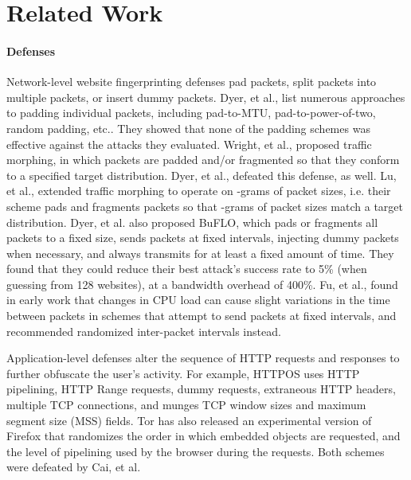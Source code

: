 \documentclass[10pt,journal]{IEEEtran}
\newcommand{\buflo} {BuFLO\xspace}
\begin{document}
\section{Related Work}
\label{sec:related-work}

\paragraph*{Defenses} Network-level website fingerprinting defenses
pad packets, split packets into multiple packets, or insert dummy
packets.  Dyer, et al., list numerous approaches to padding individual
packets, including pad-to-MTU, pad-to-power-of-two, random padding,
etc.\cite{dyer-snp12}.  They showed that none of the padding schemes
was effective against the attacks they evaluated.  Wright, et al.,
proposed traffic morphing, in which packets are padded and/or
fragmented so that they conform to a specified target
distribution\cite{wright-ndss09}.  Dyer, et al., defeated this
defense, as well\cite{dyer-snp12}.  Lu, et al., extended traffic
morphing to operate on -grams of packet sizes, i.e. their scheme
pads and fragments packets so that -grams of packet sizes match a
target distribution\cite{lu-esorics10}.  Dyer, et al. also proposed
\buflo, which pads or fragments all packets to a fixed size, sends
packets at fixed intervals, injecting dummy packets when necessary,
and always transmits for at least a fixed amount of
time\cite{dyer-snp12}.  They found that they could reduce their best
attack's success rate to 5\% (when guessing from 128 websites), at a
bandwidth overhead of 400\%.  Fu, et al., found in early work
that changes in CPU load can cause slight variations in the time
between packets in schemes that attempt to send packets at fixed
intervals, and recommended randomized inter-packet intervals
instead\cite{fu-iaw03}.

Application-level defenses alter the sequence of HTTP requests and
responses to further obfuscate the user's activity.  For example,
HTTPOS uses HTTP pipelining, HTTP Range requests, dummy requests,
extraneous HTTP headers, multiple TCP connections, and munges TCP
window sizes and maximum segment size (MSS) fields\cite{luo-ndss11}.
Tor has also released an experimental version of Firefox that
randomizes the order in which embedded objects are requested, and the
level of pipelining used by the browser during the
requests\cite{tor-randomized-pipelining}.  Both schemes were defeated
by Cai, et al\cite{cai-ccs12}.
\end{document}
